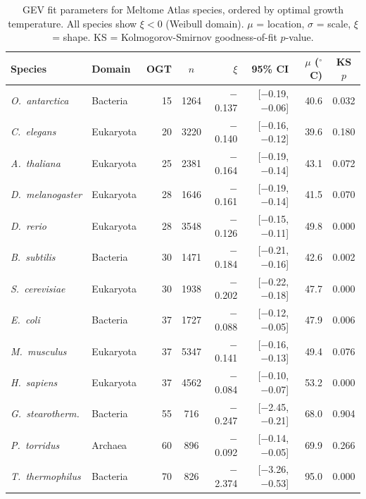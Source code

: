 \begin{table}[t]
\centering
\caption{GEV fit parameters for Meltome Atlas species, ordered by optimal growth temperature. All species show $\xi < 0$ (Weibull domain). $\mu$ = location, $\sigma$ = scale, $\xi$ = shape. KS = Kolmogorov-Smirnov goodness-of-fit $p$-value.}
\label{tab:gev_results}
\small
\begin{tabular}{@{}llrcrrrc@{}}
\toprule
\textbf{Species} & \textbf{Domain} & \textbf{OGT} & $n$ & $\xi$ & \textbf{95\% CI} & $\mu$ ($^\circ$C) & \textbf{KS $p$} \\
\midrule
\textit{O.\ antarctica} & Bacteria & 15 & 1264 & $-$0.137 & [$-$0.19, $-$0.06] & 40.6 & 0.032 \\
\textit{C.\ elegans} & Eukaryota & 20 & 3220 & $-$0.140 & [$-$0.16, $-$0.12] & 39.6 & 0.180 \\
\textit{A.\ thaliana} & Eukaryota & 25 & 2381 & $-$0.164 & [$-$0.19, $-$0.14] & 43.1 & 0.072 \\
\textit{D.\ melanogaster} & Eukaryota & 28 & 1646 & $-$0.161 & [$-$0.19, $-$0.14] & 41.5 & 0.070 \\
\textit{D.\ rerio} & Eukaryota & 28 & 3548 & $-$0.126 & [$-$0.15, $-$0.11] & 49.8 & 0.000 \\
\textit{B.\ subtilis} & Bacteria & 30 & 1471 & $-$0.184 & [$-$0.21, $-$0.16] & 42.6 & 0.002 \\
\textit{S.\ cerevisiae} & Eukaryota & 30 & 1938 & $-$0.202 & [$-$0.22, $-$0.18] & 47.7 & 0.000 \\
\textit{E.\ coli} & Bacteria & 37 & 1727 & $-$0.088 & [$-$0.12, $-$0.05] & 47.9 & 0.006 \\
\textit{M.\ musculus} & Eukaryota & 37 & 5347 & $-$0.141 & [$-$0.16, $-$0.13] & 49.4 & 0.076 \\
\textit{H.\ sapiens} & Eukaryota & 37 & 4562 & $-$0.084 & [$-$0.10, $-$0.07] & 53.2 & 0.000 \\
\textit{G.\ stearotherm.} & Bacteria & 55 & 716 & $-$0.247 & [$-$2.45, $-$0.21] & 68.0 & 0.904 \\
\textit{P.\ torridus} & Archaea & 60 & 896 & $-$0.092 & [$-$0.14, $-$0.05] & 69.9 & 0.266 \\
\textit{T.\ thermophilus} & Bacteria & 70 & 826 & $-$2.374 & [$-$3.26, $-$0.53] & 95.0 & 0.000 \\
\bottomrule
\end{tabular}
\end{table}

